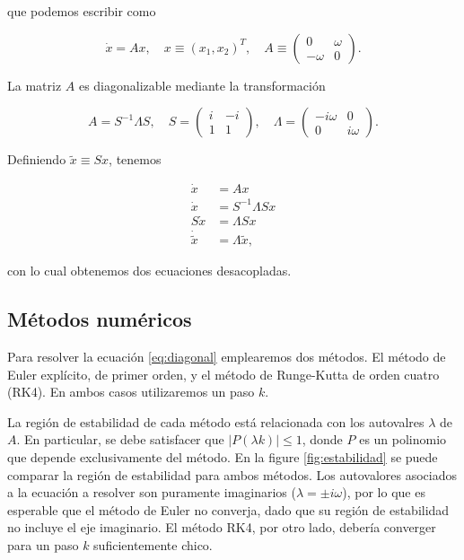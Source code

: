 \documentclass[12pt]{article}
\begin{document}
que podemos escribir como 

\begin{equation}
\dot{x} = A x, \quad x \equiv (x_1, x_2)^T, \quad A \equiv 
\begin{pmatrix}
0 & \omega \\
-\omega & 0
\end{pmatrix}.
\end{equation}

La matriz $A$ es diagonalizable mediante la transformaci\'on

\begin{equation}
A = S^{-1} \Lambda S,\quad S = 
\begin{pmatrix}
i & -i \\
1 & 1
\end{pmatrix},\quad \Lambda = 
\begin{pmatrix}
-i \omega & 0 \\ 
0 & i \omega
\end{pmatrix}.
\end{equation}

Definiendo $\tilde{x} \equiv Sx$, tenemos

\begin{align}
\dot{x} &= A x \nonumber \\
\dot{x} &= S^{-1} \Lambda S x \nonumber\\
S\dot{x} &= \Lambda S x \nonumber \\
\dot{\tilde{x}} &= \Lambda \tilde{x}, \label{eq:diagonal}
\end{align}

con lo cual obtenemos dos ecuaciones desacopladas.

\subsection{M\'etodos num\'ericos}

Para resolver la ecuaci\'on \ref{eq:diagonal} emplearemos dos m\'etodos. El m\'etodo de Euler expl\'icito, de primer orden, y el m\'etodo de Runge-Kutta de orden cuatro (RK4). En ambos casos utilizaremos un paso $k$.

La regi\'on de estabilidad  de cada m\'etodo est\'a relacionada con los autovalres $\lambda$ de $A$. En particular, se debe satisfacer que $|P(\lambda k)|\leq 1$, donde $P$ es un polinomio que depende exclusivamente del m\'etodo. En la figure \ref{fig:estabilidad} se puede comparar la regi\'on de estabilidad para ambos m\'etodos. Los autovalores asociados a la ecuaci\'on a resolver son puramente imaginarios ($\lambda = \pm i \omega$), por lo que es esperable que el m\'etodo de Euler no converja, dado que su regi\'on de estabilidad no incluye el eje imaginario. El m\'etodo RK4, por otro lado, deber\'ia converger para un paso $k$ suficientemente chico.
\end{document}
